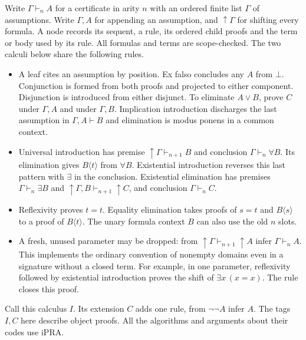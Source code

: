 Write $\Gamma\vdash_n A$ for a certificate in arity $n$ with an
ordered finite list $\Gamma$ of assumptions. Write $\Gamma,A$ for
appending an assumption, and $\uparrow\Gamma$ for shifting every
formula. A node records its sequent, a rule, its ordered child proofs
and the term or body used by its rule. All formulas and terms are
scope-checked. The two calculi below share the following rules.
\begin{itemize}
\item A leaf cites an assumption by position. Ex falso concludes
any $A$ from $\bot$. Conjunction is formed from both proofs and projected
to either component. Disjunction is introduced from either disjunct.
To eliminate $A\vee B$, prove $C$ under $\Gamma,A$ and under
$\Gamma,B$. Implication introduction discharges the last assumption
in $\Gamma,A\vdash B$ and elimination is modus ponens in a common
context.
\item Universal introduction has premise
$\uparrow\Gamma\vdash_{n+1}B$ and conclusion
$\Gamma\vdash_n\forall B$. Its elimination gives $B\langle t\rangle$
from $\forall B$. Existential introduction reverses this last pattern
with $\exists$ in the conclusion. Existential elimination has premises
$\Gamma\vdash_n\exists B$ and
$\uparrow\Gamma,B\vdash_{n+1}\uparrow C$, and conclusion
$\Gamma\vdash_n C$.
\item Reflexivity proves $t=t$. Equality elimination takes proofs
of $s=t$ and $B\langle s\rangle$ to a proof of $B\langle t\rangle$.
The unary formula context $B$ can also use the old $n$ slots.
\item A fresh, unused parameter may be dropped:
from $\uparrow\Gamma\vdash_{n+1}\uparrow A$ infer
$\Gamma\vdash_n A$. This implements the ordinary convention of
nonempty domains even in a signature without a closed term. For example,
in one parameter, reflexivity followed by existential introduction proves
the shift of $\exists x\,(x=x)$. The rule closes this proof.
\end{itemize}
Call this calculus $I$. Its extension $C$ adds one rule, from
$\neg\neg A$ infer $A$. The tags $I,C$ here describe object proofs.
All the algorithms and arguments about their codes use iPRA.

